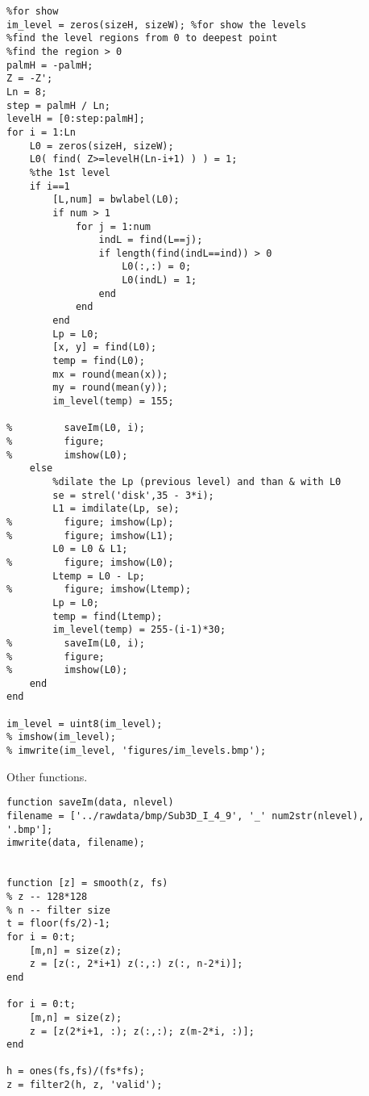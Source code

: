 \begin{verbatim}
%for show
im_level = zeros(sizeH, sizeW); %for show the levels
%find the level regions from 0 to deepest point 
%find the region > 0
palmH = -palmH;
Z = -Z';
Ln = 8;
step = palmH / Ln;
levelH = [0:step:palmH];
for i = 1:Ln
    L0 = zeros(sizeH, sizeW);
    L0( find( Z>=levelH(Ln-i+1) ) ) = 1;
    %the 1st level
    if i==1
        [L,num] = bwlabel(L0);
        if num > 1
            for j = 1:num
                indL = find(L==j);
                if length(find(indL==ind)) > 0
                    L0(:,:) = 0;
                    L0(indL) = 1;
                end
            end
        end
        Lp = L0;
        [x, y] = find(L0);
        temp = find(L0);
        mx = round(mean(x));
        my = round(mean(y));
        im_level(temp) = 155;

%         saveIm(L0, i);
%         figure;
%         imshow(L0);
    else
        %dilate the Lp (previous level) and than & with L0
        se = strel('disk',35 - 3*i);  
        L1 = imdilate(Lp, se);
%         figure; imshow(Lp);
%         figure; imshow(L1);
        L0 = L0 & L1;
%         figure; imshow(L0);
        Ltemp = L0 - Lp;
%         figure; imshow(Ltemp);
        Lp = L0; 
        temp = find(Ltemp);
        im_level(temp) = 255-(i-1)*30;
%         saveIm(L0, i);
%         figure;
%         imshow(L0);
    end    
end

im_level = uint8(im_level);
% imshow(im_level);
% imwrite(im_level, 'figures/im_levels.bmp');
\end{verbatim}
\clearpage

Other functions.

\begin{verbatim}
function saveIm(data, nlevel)
filename = ['../rawdata/bmp/Sub3D_I_4_9', '_' num2str(nlevel), '.bmp'];
imwrite(data, filename);


function [z] = smooth(z, fs)
% z -- 128*128
% n -- filter size
t = floor(fs/2)-1;
for i = 0:t;
    [m,n] = size(z);
    z = [z(:, 2*i+1) z(:,:) z(:, n-2*i)];
end

for i = 0:t;
    [m,n] = size(z);
    z = [z(2*i+1, :); z(:,:); z(m-2*i, :)];
end

h = ones(fs,fs)/(fs*fs);
z = filter2(h, z, 'valid');
\end{verbatim}
\clearpage